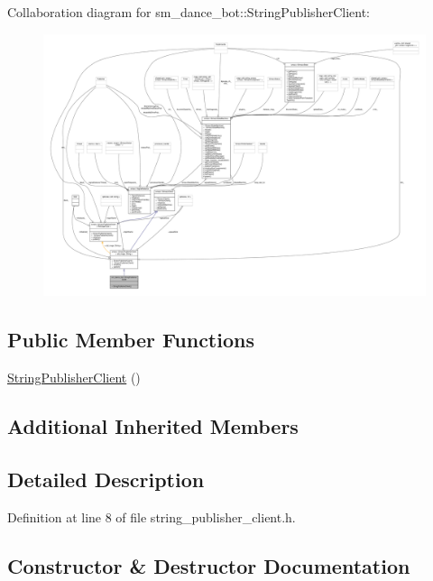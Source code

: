 Collaboration diagram for sm\+\_\+dance\+\_\+bot\+:\+:String\+Publisher\+Client\+:
\nopagebreak
\begin{figure}[H]
\begin{center}
\leavevmode
\includegraphics[width=350pt]{classsm__dance__bot_1_1StringPublisherClient__coll__graph}
\end{center}
\end{figure}
\subsection*{Public Member Functions}
\begin{DoxyCompactItemize}
\item 
\hyperlink{classsm__dance__bot_1_1StringPublisherClient_a18e0e0c445f4e063ce681936b5466494}{String\+Publisher\+Client} ()
\end{DoxyCompactItemize}
\subsection*{Additional Inherited Members}


\subsection{Detailed Description}


Definition at line 8 of file string\+\_\+publisher\+\_\+client.\+h.



\subsection{Constructor \& Destructor Documentation}
